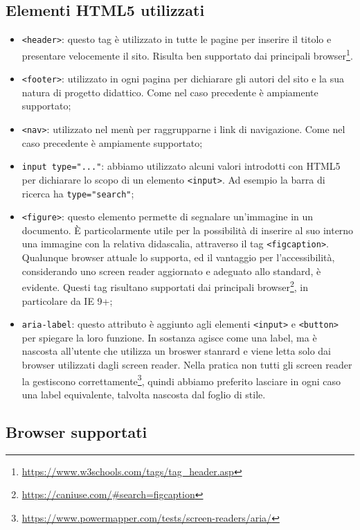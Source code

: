 \documentclass[12pt]{article}
\newcommand{\code}[1]{\texttt{#1}}
\begin{document}
	\subsection{Elementi HTML5 utilizzati}
	\begin{itemize}
		\item \code{<header>}: questo tag è utilizzato in tutte le pagine per inserire il titolo e presentare velocemente il sito. Risulta ben supportato dai principali browser\footnote{\url{https://www.w3schools.com/tags/tag_header.asp}}.
		\item \code{<footer>}: utilizzato in ogni pagina per dichiarare gli autori del sito e la sua natura di progetto didattico. Come nel caso precedente è ampiamente supportato;
		\item \code{<nav>}: utilizzato nel menù per raggrupparne i link di navigazione. Come nel caso precedente è ampiamente supportato;
		\item \code{input type="..."}: abbiamo utilizzato alcuni valori introdotti con HTML5 per dichiarare lo scopo di un elemento \code{<input>}. Ad esempio la barra di ricerca ha \code{type="search"};
		\item \code{<figure>}: questo elemento permette di segnalare un'immagine in un documento. È particolarmente utile per la possibilità di inserire al suo interno una immagine con la relativa didascalia, attraverso il tag \code{<figcaption>}. Qualunque browser attuale lo supporta, ed il vantaggio per l'accessibilità, considerando uno screen reader aggiornato e adeguato allo standard, è evidente. Questi tag risultano supportati dai principali browser\footnote{\url{https://caniuse.com/\#search=figcaption}}, in particolare da IE 9+;
		\item \code{aria-label}: questo attributo è aggiunto agli elementi \code{<input>} e \code{<button>} per spiegare la loro funzione. In sostanza agisce come una label, ma è nascosta all'utente che utilizza un broswer stanrard e viene letta solo dai browser utilizzati dagli screen reader. Nella pratica non tutti gli screen reader la gestiscono correttamente\footnote{\url{https://www.powermapper.com/tests/screen-readers/aria/}}, quindi abbiamo preferito lasciare in ogni caso una label equivalente, talvolta nascosta dal foglio di stile.
	\end{itemize}
	
	\subsection{Browser supportati}
	
\end{document}
